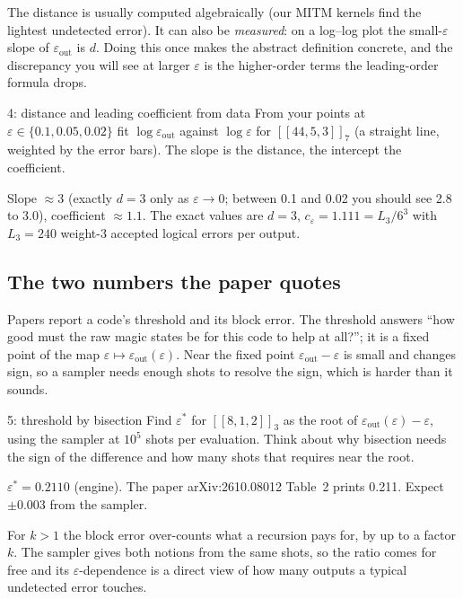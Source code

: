 \documentclass[11pt]{article}
\newcommand{\eps}{\varepsilon}
\begin{document}
The distance is usually computed algebraically (our MITM kernels find the lightest
undetected error). It can also be \emph{measured}: on a log--log plot the
small-$\eps$ slope of $\eps_{\mathrm{out}}$ is $d$. Doing this once makes the
abstract definition concrete, and the discrepancy you will see at larger $\eps$ is
the higher-order terms the leading-order formula drops.

\begin{exercise}{4: distance and leading coefficient from data}
From your points at $\eps\in\{0.1,0.05,0.02\}$ fit $\log\eps_{\mathrm{out}}$ against
$\log\eps$ for $[[44,5,3]]_7$ (a straight line, weighted by the error bars). The slope
is the distance, the intercept the coefficient.
\end{exercise}
\begin{checkbox}
Slope $\approx 3$ (exactly $d=3$ only as $\eps\to0$; between 0.1 and 0.02 you should
see 2.8 to 3.0), coefficient $\approx 1.1$. The exact values are $d=3$,
$c_\eps = 1.111 = L_3/6^3$ with $L_3 = 240$ weight-3 accepted logical errors per
output.
\end{checkbox}

\subsection*{The two numbers the paper quotes}

Papers report a code's threshold and its block error. The threshold answers ``how
good must the raw magic states be for this code to help at all?''; it is a fixed
point of the map $\eps\mapsto\eps_{\mathrm{out}}(\eps)$. Near the fixed point
$\eps_{\mathrm{out}}-\eps$ is small and changes sign, so a sampler needs enough
shots to resolve the sign, which is harder than it sounds.

\begin{exercise}{5: threshold by bisection}
Find $\eps^{*}$ for $[[8,1,2]]_3$ as the root of $\eps_{\mathrm{out}}(\eps)-\eps$,
using the sampler at $10^{5}$ shots per evaluation. Think about why bisection needs
the sign of the difference and how many shots that requires near the root.
\end{exercise}
\begin{checkbox}
$\eps^{*}=0.2110$ (engine). The paper arXiv:2610.08012 Table~2 prints 0.211. Expect
$\pm0.003$ from the sampler.
\end{checkbox}

For $k>1$ the block error over-counts what a recursion pays for, by up to a factor
$k$. The sampler gives both notions from the same shots, so the ratio comes for free
and its $\eps$-dependence is a direct view of how many outputs a typical undetected
error touches.
\end{document}
